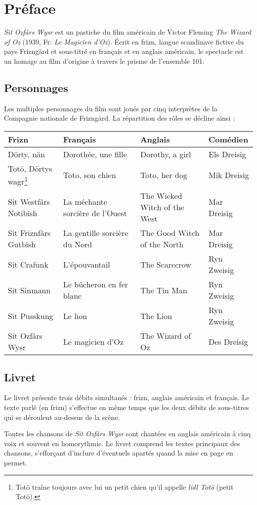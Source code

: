\chapter*{Préface}
\emph{Sit Ozfårs Wysr} est un pastiche du film américain
de Victor Fleming \emph{The Wizard of Oz} (1939, Fr: \emph{Le Magicien d'Oz}).
Écrit en frizn, langue
scandinave fictive du pays Frizngård et \og{}sous-titré\fg{} en français et en anglais
américain,
le spectacle est un homage au film d'origine à travers le prisme de
l'ensemble 101.
\section*{Personnages}
Les multiples personnages du film sont joués par cinq interprètes de la
Compagnie nationale de Frizngård. La répartition des
rôles se décline ainsi :
\begin{longtable}{p{2.7cm}|p{2.7cm}|p{2.7cm}|p{2.7cm}}
Frizn & Français & Anglais & Comédien\\\hline
Dörty, nän & Dorothée, une fille & Dorothy, a girl & Els Dreisig\\\hdashline
Totö, Dörtys wagr\footnote{Totö traîne toujours avec lui un petit chien
qu'il appelle \og{}\emph{lidl Totö}\fg{} (petit Totö).} & Toto, son chien & Toto, her dog & Mik Dreisig\\\hdashline
Sit Westfårs Notibish & La méchante sorcière de l'Ouest & The Wicked Witch of the West &
Mar Dreisig \\\hdashline
Sit Friznfårs Gutbish & La gentille sorcière
du Nord & The Good Witch of the North &
Mar Dreisig \\\hdashline
Sit Crafunk & L'épouvantail & The Scarecrow & Ryn Zweisig \\\hdashline
Sit Sinmann & Le bûcheron en fer blanc & The Tin Man & Ryn Zweisig \\\hdashline
Sit Pusskung & Le lion & The Lion & Ryn Zweisig \\\hdashline
Sit Ozfårs Wysr & Le magicien d'Oz & The Wizard of Oz & Des Dreisig \\
\end{longtable}
\begin{comment}
Tout autre personnage du film ne figurant pas sur la liste ci-dessus
n'existe dans le spectacle que par allusion.
\end{comment}
\section*{Livret}
Le livret présente trois débits simultanés : frizn, anglais américain et français. Le
texte parlé (en frizn) s'effectue en même temps que les deux débits de
sous-titres qui se déroulent au-dessus de la scène.\par
Toutes les chansons de \emph{Sit Ozfårs Wysr} sont chantées en anglais
américain
à cinq voix et souvent en homorythmie.  Le livret comprend les textes
principaux des chansons, s'efforçant d'inclure d'éventuels apartés quand
la mise en page en permet.
